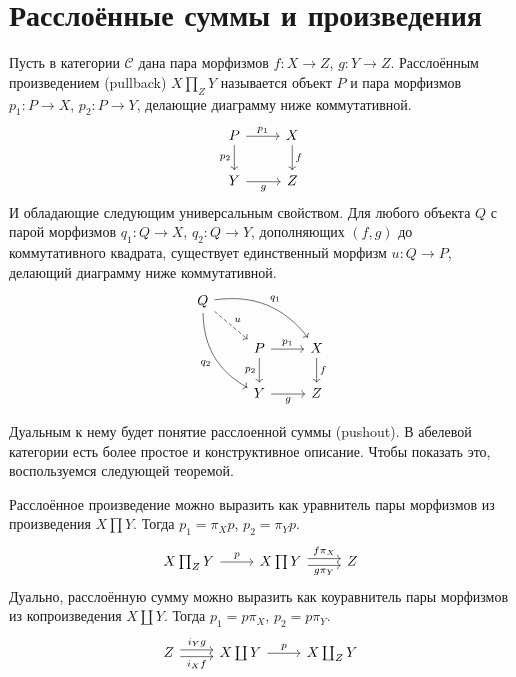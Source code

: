 \documentclass[../hw_main.tex]{subfiles}
\begin{document}
\section{Расслоённые суммы и произведения}
\begin{to_def}\label{A:pullback_def}
Пусть в категории $\mathcal{C}$ дана пара морфизмов $f:X\to Z$, $g:Y\to Z$. Расслоённым произведением (pullback) $X\prod_Z Y$ называется объект $P$ и пара морфизмов $p_1:P \to X$, $p_2:P\to Y$, делающие диаграмму ниже коммутативной.
\begin{equation}\label{A:pullback_comm}
    \begin{tikzcd}
	P & X \\
	Y & Z
	\arrow["g"', from=2-1, to=2-2]
	\arrow["f", from=1-2, to=2-2]
	\arrow["{p_1}", from=1-1, to=1-2]
	\arrow["{p_2}"', from=1-1, to=2-1]
\end{tikzcd}
\end{equation}
И обладающие следующим универсальным свойством. Для любого объекта $Q$ с парой морфизмов $q_1:Q\to X$, $q_2:Q\to Y$, дополняющих $(f, g)$ до коммутативного квадрата, существует единственный морфизм $u: Q\to P$, делающий диаграмму ниже коммутативной.
\begin{equation}\label{A:pullback_univ}
\begin{tikzcd}
	Q \\
	& P & X \\
	& Y & Z
	\arrow["{p_2}"', from=2-2, to=3-2]
	\arrow["g"', from=3-2, to=3-3]
	\arrow["f", from=2-3, to=3-3]
	\arrow["{p_1}", from=2-2, to=2-3]
	\arrow["{q_1}", bend left, from=1-1, to=2-3]
	\arrow["{q_2}"', bend right, from=1-1, to=3-2]
	\arrow["u", dashed, from=1-1, to=2-2]
\end{tikzcd}
\end{equation}
\end{to_def}
Дуальным к нему будет понятие расслоенной суммы (pushout). В абелевой категории есть более простое и конструктивное описание. Чтобы показать это, воспользуемся следующей теоремой.
\begin{to_thr}\label{A:pull_as_coeq}
Расслоённое произведение можно выразить как уравнитель пары морфизмов из произведения $X\prod Y$. Тогда $p_1 = \pi_X p$, $p_2 = \pi_Y p$.
\begin{equation*}
    \begin{tikzcd}
	{X\prod_ZY} & {X\prod Y} & Z
	\arrow["{f\pi_X}", shift left=1, from=1-2, to=1-3]
	\arrow["{g\pi_Y}"', shift right=1, from=1-2, to=1-3]
	\arrow["p", from=1-1, to=1-2]
\end{tikzcd}
\end{equation*}
Дуально, расслоённую сумму можно выразить как коуравнитель пары морфизмов из копроизведения $X\coprod Y$. Тогда $p_1 = p\pi_X$, $p_2 = p\pi_Y$.
\begin{equation*}
    \begin{tikzcd}
	Z & {X\coprod Y} & {X\coprod_Z Y}
	\arrow["{i_X f}"', shift right=1, from=1-1, to=1-2]
	\arrow["{i_Yg}", shift left=1, from=1-1, to=1-2]
	\arrow["p", from=1-2, to=1-3]
\end{tikzcd}
\end{equation*}
\end{to_thr}
\end{document}
